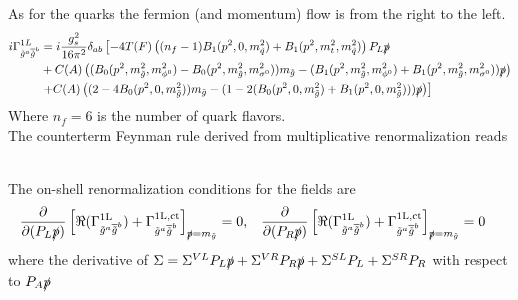As for the quarks the fermion (and momentum) flow is from the right to the left.
\begin{align}
i\Gamma^{1L}_{\tilde{g}^a \overline{\tilde{g}}^b} &= i \frac{g_s^2}{16\pi^2}\delta_{ab} \left[-4T(F)\left( (n_f-1) B_1(p^2,0,m_{\tilde{q}}^2) + B_1(p^2,m_t^2,m_{\tilde{q}}^2) \right)P_L \slashed{p} \right.\nonumber\\
& + C(A)\left( (B_0(p^2,m_{\tilde{g}}^2,m_{\phi^0}^2) - B_0(p^2,m_{\tilde{g}}^2,m_{\sigma^0}^2))m_{\tilde{g}} - (B_1(p^2,m_{\tilde{g}}^2,m_{\phi^0}^2) + B_1(p^2,m_{\tilde{g}}^2,m_{\sigma^0}^2))\slashed{p} \right) \nonumber\\
&\left.+ C(A)\left( (2 - 4 B_0(p^2,0,m_{\tilde{g}}^2)) m_{\tilde{g}} - (1-2(B_0(p^2,0,m_{\tilde{g}}^2) + B_1(p^2,0,m_{\tilde{g}}^2)))\slashed{p} \right)\right]
\end{align}
Where $n_f = 6$ is the number of quark flavors.\\
The counterterm Feynman rule derived from multiplicative renormalization reads\\
\\
The on-shell renormalization conditions for the fields are
\begin{align}
& \frac{\partial}{\partial (P_L\slashed{p})} \left[ \Re (\Gamma^{\mathrm{1L}}_{\tilde{g}^a \overline{\tilde{g}}^b}) + \Gamma^{\mathrm{1L,ct}}_{\tilde{g}^a \overline{\tilde{g}}^b}  \right]_{\slashed{p} = m_{\tilde{g}}} = 0,
&& \frac{\partial}{\partial (P_R\slashed{p})} \left[ \Re (\Gamma^{\mathrm{1L}}_{\tilde{g}^a \overline{\tilde{g}}^b}) + \Gamma^{\mathrm{1L,ct}}_{\tilde{g}^a \overline{\tilde{g}}^b}  \right]_{\slashed{p} = m_{\tilde{g}}} = 0
\end{align}
where the derivative of $\Sigma = \Sigma^{VL}P_L\slashed{p} + \Sigma^{VR}P_R\slashed{p} + \Sigma^{SL}P_L + \Sigma^{SR}P_R$ with respect to $P_A\slashed{p}$ \\
